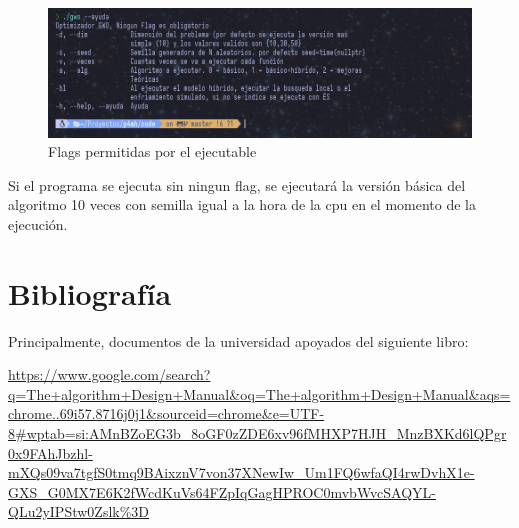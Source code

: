 \documentclass[a4paper, 12.5pt]{report}
\begin{document}
\begin{figure}[H]
    \centering
    \caption{Flags permitidas por el ejecutable}
    \includegraphics[width=\textwidth]{dash_help_program.png}


\end{figure}

Si el programa se ejecuta sin ningun flag, se ejecutará la versión básica del algoritmo 10 veces con semilla igual a la hora de la cpu en el momento de la ejecución.



\section{Bibliografía}

Principalmente, documentos de la universidad apoyados del siguiente libro:

\url{https://www.google.com/search?q=The+algorithm+Design+Manual&oq=The+algorithm+Design+Manual&aqs=chrome..69i57.8716j0j1&sourceid=chrome&e=UTF-8#wptab=si:AMnBZoEG3b_8oGF0zZDE6xv96fMHXP7HJH_MnzBXKd6lQPgr0x9FAhJbzhl-mXQs09va7tgfS0tmq9BAixznV7von37XNewIw_Um1FQ6wfaQI4rwDvhX1e-GXS_G0MX7E6K2fWcdKuVs64FZpIqGagHPROC0mvbWvcSAQYL-QLu2yIPStw0Zslk%3D}
\end{document}
